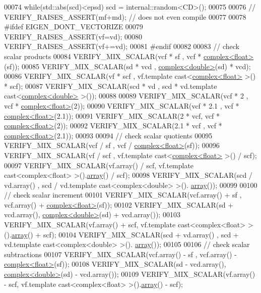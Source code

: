 \begin{DoxyCode}
00074   \textcolor{keywordflow}{while}(std::abs(scd)<epsd) scd = internal::random<CD>();
00075 
00076 \textcolor{comment}{//   VERIFY\_RAISES\_ASSERT(mf+md); // does not even compile}
00077 
00078 \textcolor{preprocessor}{#ifdef EIGEN\_DONT\_VECTORIZE}
00079   VERIFY\_RAISES\_ASSERT(vf=vd);
00080   VERIFY\_RAISES\_ASSERT(vf+=vd);
00081 \textcolor{preprocessor}{#endif}
00082   
00083   \textcolor{comment}{// check scalar products}
00084   VERIFY\_MIX\_SCALAR(vcf * sf , vcf * \hyperlink{structcomplex}{complex<float>}(sf));
00085   VERIFY\_MIX\_SCALAR(sd * vcd , \hyperlink{structcomplex}{complex<double>}(sd) * vcd);
00086   VERIFY\_MIX\_SCALAR(vf * scf , vf.template cast<\hyperlink{structcomplex}{complex<float>} >() * scf);
00087   VERIFY\_MIX\_SCALAR(scd * vd , scd * vd.template cast<\hyperlink{structcomplex}{complex<double>} >());
00088 
00089   VERIFY\_MIX\_SCALAR(vcf * 2 , vcf * \hyperlink{structcomplex}{complex<float>}(2));
00090   VERIFY\_MIX\_SCALAR(vcf * 2.1 , vcf * \hyperlink{structcomplex}{complex<float>}(2.1));
00091   VERIFY\_MIX\_SCALAR(2 * vcf, vcf * \hyperlink{structcomplex}{complex<float>}(2));
00092   VERIFY\_MIX\_SCALAR(2.1 * vcf , vcf * \hyperlink{structcomplex}{complex<float>}(2.1));
00093 
00094   \textcolor{comment}{// check scalar quotients}
00095   VERIFY\_MIX\_SCALAR(vcf / sf , vcf / \hyperlink{structcomplex}{complex<float>}(sf));
00096   VERIFY\_MIX\_SCALAR(vf / scf , vf.template cast<\hyperlink{structcomplex}{complex<float>} >() / scf);
00097   VERIFY\_MIX\_SCALAR(vf.array()  / scf, vf.template cast<complex<float> >().\hyperlink{class_eigen_1_1array}{array}() / scf);
00098   VERIFY\_MIX\_SCALAR(scd / vd.array() , scd / vd.template cast<complex<double> >().
      \hyperlink{class_eigen_1_1array}{array}());
00099 
00100   \textcolor{comment}{// check scalar increment}
00101   VERIFY\_MIX\_SCALAR(vcf.array() + sf , vcf.array() + \hyperlink{structcomplex}{complex<float>}(sf));
00102   VERIFY\_MIX\_SCALAR(sd  + vcd.array(), \hyperlink{structcomplex}{complex<double>}(sd) + vcd.array());
00103   VERIFY\_MIX\_SCALAR(vf.array()  + scf, vf.template cast<complex<float> >().\hyperlink{class_eigen_1_1array}{array}() + scf);
00104   VERIFY\_MIX\_SCALAR(scd + vd.array() , scd + vd.template cast<complex<double> >().
      \hyperlink{class_eigen_1_1array}{array}());
00105 
00106   \textcolor{comment}{// check scalar subtractions}
00107   VERIFY\_MIX\_SCALAR(vcf.array() - sf , vcf.array() - \hyperlink{structcomplex}{complex<float>}(sf));
00108   VERIFY\_MIX\_SCALAR(sd  - vcd.array(), \hyperlink{structcomplex}{complex<double>}(sd) - vcd.array());
00109   VERIFY\_MIX\_SCALAR(vf.array()  - scf, vf.template cast<complex<float> >().\hyperlink{class_eigen_1_1array}{array}() - scf);

\end{DoxyCode}
